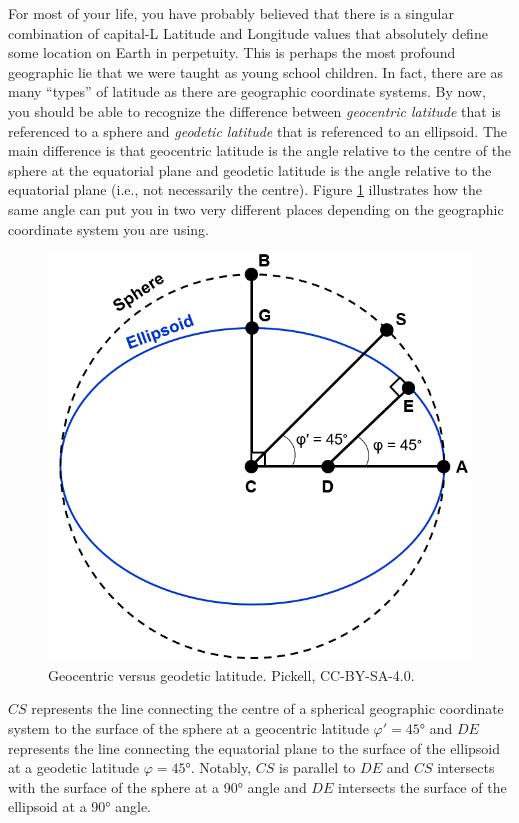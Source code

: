 \documentclass[
]{book}
\begin{document}
For most of your life, you have probably believed that there is a singular combination of capital-L Latitude and Longitude values that absolutely define some location on Earth in perpetuity. This is perhaps the most profound geographic lie that we were taught as young school children. In fact, there are as many ``types'' of latitude as there are geographic coordinate systems. By now, you should be able to recognize the difference between \emph{geocentric latitude} that is referenced to a sphere and \emph{geodetic latitude} that is referenced to an ellipsoid. The main difference is that geocentric latitude is the angle relative to the centre of the sphere at the equatorial plane and geodetic latitude is the angle relative to the equatorial plane (i.e., not necessarily the centre). Figure \ref{fig:2-geocentric-geodetic-latitude} illustrates how the same angle can put you in two very different places depending on the geographic coordinate system you are using.

\begin{figure}
\includegraphics[width=0.75\linewidth]{images/02-geocentric-geodetic-latitude} \caption{Geocentric versus geodetic latitude. Pickell, CC-BY-SA-4.0.}\label{fig:2-geocentric-geodetic-latitude}
\end{figure}

\(CS\) represents the line connecting the centre of a spherical geographic coordinate system to the surface of the sphere at a geocentric latitude \(φ′=45°\) and \(DE\) represents the line connecting the equatorial plane to the surface of the ellipsoid at a geodetic latitude \(φ=45°\). Notably, \(CS\) is parallel to \(DE\) and \(CS\) intersects with the surface of the sphere at a 90° angle and \(DE\) intersects the surface of the ellipsoid at a 90° angle.
\end{document}
